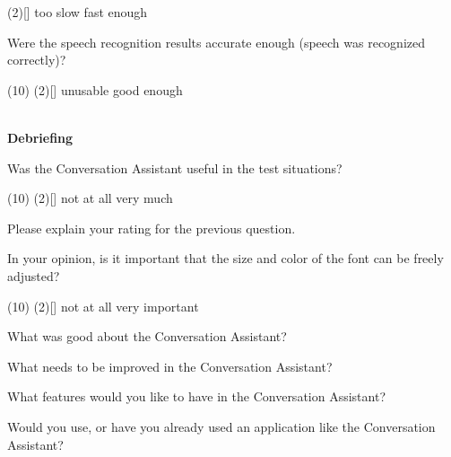 \documentclass[english, 12pt, a4paper, pdftex, elec, utf8]{aaltothesis}
\begin{document}
{\begin{questionnaire}[resume]
\begin{tasks}[]
            \task*(2)[] too slow
            \task[] fast enough
        \end{tasks}
        \item Were the speech recognition results accurate enough (speech was recognized correctly)?
        \begin{tasks}[](10)
            \task*(2)[] unusable
            \task[] good enough \\\\
        \end{tasks}
    \end{questionnaire}
    \noindent
    \hspace{0.35cm}
    \textbf{Debriefing}
    \vspace{0.15cm}
    \begin{questionnaire}[resume]
        \item Was the Conversation Assistant useful in the test situations?
        \begin{tasks}[](10)
            \task*(2)[] not at all
            \task[] very much
        \end{tasks}
        \item Please explain your rating for the previous question.
        \item In your opinion, is it important that the size and color of the font can be freely adjusted?
        \begin{tasks}[](10)
            \task*(2)[] not at all
            \task[] very important
        \end{tasks}
        \item What was good about the Conversation Assistant?
        \item What needs to be improved in the Conversation Assistant?
        \item What features would you like to have in the Conversation Assistant?
        \item Would you use, or have you already used an application like the Conversation Assistant?

\end{questionnaire}}
\end{document}
